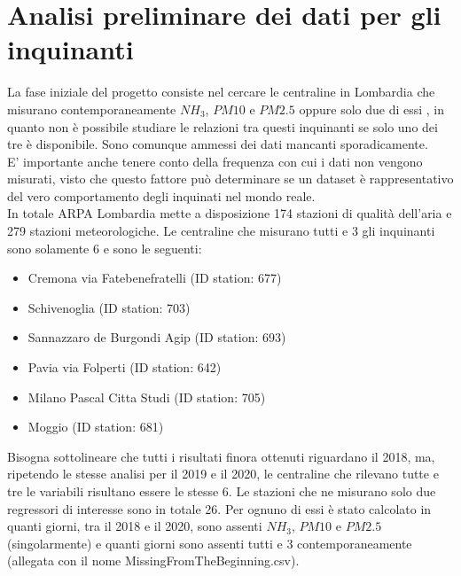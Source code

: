 \documentclass{article}
\begin{document}
\section{Analisi preliminare dei dati per gli inquinanti}
La fase iniziale del progetto consiste nel cercare le centraline in Lombardia
che misurano contemporaneamente $NH_{3}$, $PM10$ e $PM2.5$ oppure solo due di essi
, in quanto non è possibile
studiare le relazioni tra questi inquinanti se solo uno dei tre è disponibile.
Sono comunque ammessi dei dati mancanti sporadicamente.
\\E' importante anche tenere conto della frequenza con cui i dati non vengono misurati, visto che questo
fattore può determinare se un dataset è rappresentativo del vero comportamento degli inquinati nel mondo reale.
\\In totale ARPA Lombardia mette a disposizione 174 stazioni di qualità dell'aria e 279 stazioni 
meteorologiche.
Le centraline che misurano tutti e 3 gli inquinanti sono solamente 6 e sono le seguenti:
\begin{itemize}
    \item Cremona via Fatebenefratelli (ID station: 677)
    \item Schivenoglia (ID station: 703)
    \item Sannazzaro de Burgondi Agip (ID station: 693)
    \item Pavia via Folperti (ID station: 642)
    \item Milano Pascal Citta Studi (ID station: 705)
    \item Moggio (ID station: 681)
\end{itemize}
Bisogna sottolineare che tutti i risultati finora ottenuti riguardano il 2018, ma, ripetendo le stesse analisi per il 2019 e il 2020, 
le centraline che rilevano tutte e tre le variabili risultano essere le stesse 6.
Le stazioni che ne misurano solo due regressori di interesse sono in totale 26.
Per ognuno di essi è stato calcolato in quanti giorni, tra il 2018 e il 2020, sono assenti
$NH_{3}$, $PM10$ e $PM2.5$ (singolarmente) e quanti giorni sono assenti tutti e 3 contemporaneamente
(allegata con il nome MissingFromTheBeginning.csv). 
\end{document}

